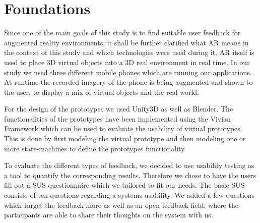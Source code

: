 \documentclass[11pt, a4paper]{article}
\begin{document}
	\section*{Foundations}\label{sec:foundations}
		Since one of the main goals of this study is to find suitable user feedback for augmented reality environments, it shall be further clarified what \ac{AR} means in the context of this study and which technologies were used during it. \ac{AR} itself is used to place 3D virtual objects into a 3D real environment in real time. In our study we used three different mobile phones which are running our applications. At runtime the recorded imagery of the phone is being augmented and shown to the user, to display a mix of virtual objects and the real world.

		For the design of the prototypes we used Unity3D as well as Blender. The functionalities of the prototypes have been implemented using the Vivian Framework which can be used to evaluate the usability of virtual prototypes. This is done by first modeling the virtual prototype and then modeling one or more state-machines to define the prototypes functionality.

		To evaluate the different types of feedback, we decided to use usability testing as a tool to quantify the corresponding results. Therefore we chose to have the users fill out a \ac{SUS} questionnaire which we tailored to fit our needs. The basic \ac{SUS} consists of ten questions regarding a systems usability. We added a few questions which target the feedback more as well as an open feedback field, where the participants are able to share their thoughts on the system with us.
\end{document}
